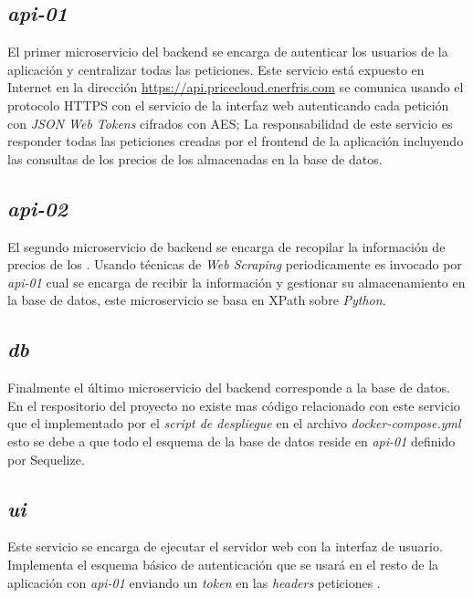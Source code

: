 \subsection{\emph{api-01}}
El primer microservicio del backend se encarga de autenticar los usuarios de la aplicación y centralizar todas las peticiones. Este servicio está expuesto en Internet en la dirección \url{https://api.pricecloud.enerfris.com} se comunica usando el protocolo \acrfull{HTTPS} con el servicio de la interfaz web autenticando cada petición con \emph{JSON Web Tokens} cifrados con \acrfull{AES}; La responsabilidad de este servicio es responder todas las peticiones creadas por el frontend de la aplicación incluyendo las consultas de los precios de los  almacenadas en la base de datos.

\subsection{\emph{api-02}}
El segundo microservicio de backend se encarga de recopilar la información de precios de los . Usando técnicas de \emph{Web Scraping} periodicamente es invocado por \emph{api-01} cual se encarga de recibir la información y gestionar su almacenamiento en la base de datos, este microservicio se basa en \gls{XPath} sobre \emph{Python}.

\subsection{\emph{db}}
Finalmente el último microservicio del backend corresponde a la base de datos. En el respositorio del proyecto no existe mas código relacionado con este servicio que el implementado por el \emph{script de despliegue} en el archivo \emph{docker-compose.yml} esto se debe a que todo el esquema de la base de datos reside en \emph{api-01} definido por \gls{Sequelize}.

\subsection{\emph{ui}}
Este servicio se encarga de ejecutar el servidor web con la interfaz de usuario. Implementa el esquema básico de autenticación que se usará en el resto de la aplicación con \emph{api-01} enviando un \emph{token} en las \emph{headers} peticiones .
